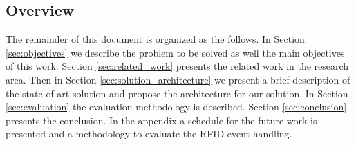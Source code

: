 \subsection{Overview}
\label{sub:overview}
The remainder of this document is organized as the follows. In Section \ref{sec:objectives}
we describe the problem to be solved as well the main objectives of this work. Section \ref{sec:related_work}
presents the related work in the research area. Then in Section \ref{sec:solution_architecture}
we present a brief description of the state of art solution and propose the architecture
for our solution. In Section \ref{sec:evaluation} the evaluation methodology is described.
Section \ref{sec:conclusion} presents the conclusion. In the appendix a schedule
for the future work is presented and a methodology to evaluate the RFID event handling.

